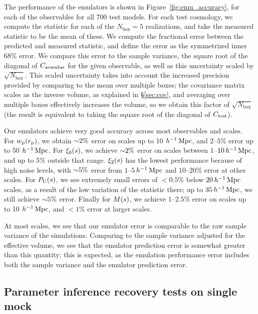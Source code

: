 The performance of the emulators is shown in Figure~\ref{fig:emu_accuracy}, for each of the observables for all 700 test models.
For each test cosmology, we compute the statistic for each of the $N_\mathrm{box}=5$ realizations, and take the measured statistic to be the mean of these.
We compute the fractional error between the predicted and measured statistic, and define the error as the symmetrized inner 68\% error.
We compare this error to the sample variance, the square root of the diagonal of $C_\text{aemulus}$ for the given observable, as well as this uncertainty scaled by $\sqrt{N_\mathrm{box}}$.
This scaled uncertainty takes into account the increased precision provided by comparing to the mean over multiple boxes; the covariance matrix scales as the inverse volume, as explained in \S\ref{sec:cov}, and averaging over multiple boxes effectively increases the volume, so we obtain this factor of $\sqrt{N_\mathrm{box}}$ (the result is equivalent to taking the square root of the diagonal of $C_\text{test}$).

Our emulators achieve very good accuracy across most observables and scales.
For $w_\mathrm{p}(r_\mathrm{p})$, we obtain $\mathord{\sim}2\%$ error on scales up to 10 $h^{-1}\,\mathrm{Mpc}$, and $2$--$5\%$ error up to 50 $h^{-1}\,\mathrm{Mpc}$.
For $\xi_0(s)$, we achieve $\mathord{\sim}2\%$ error on scales between $1$--$10 \, h^{-1}\,\mathrm{Mpc}$, and up to $5\%$ outside that range.
$\xi_2(s)$ has the lowest performance because of high noise levels, with $\mathord{\sim}5\%$ error from $1$--$5 \, h^{-1}\,\mathrm{Mpc}$ and $10$--$20\%$ error at other scales.
For $P_\mathrm{U}(s)$, we see extremely small errors of $<0.5\%$ below $20 \, h^{-1}\,\mathrm{Mpc}$ scales, as a result of the low variation of the statistic there; up to $35 \, h^{-1}\,\mathrm{Mpc}$, we still achieve $\mathord{\sim}5\%$ error.
Finally for $M(s)$, we achieve $1$--$2.5\%$ error on scales up to 10 $h^{-1}\,\mathrm{Mpc}$, and $<1\%$ error at larger scales.

At most scales, we see that our emulator error is comparable to the raw sample variance of the \aemulus simulations.
Comparing to the sample variance adjusted for the effective volume, we see that the emulator prediction error is somewhat greater than this quantity; this is expected, as the emulation performance error includes both the sample variance and the emulator prediction error.


\subsection{Parameter inference recovery tests on single mock}
\label{sec:recovery_single}


